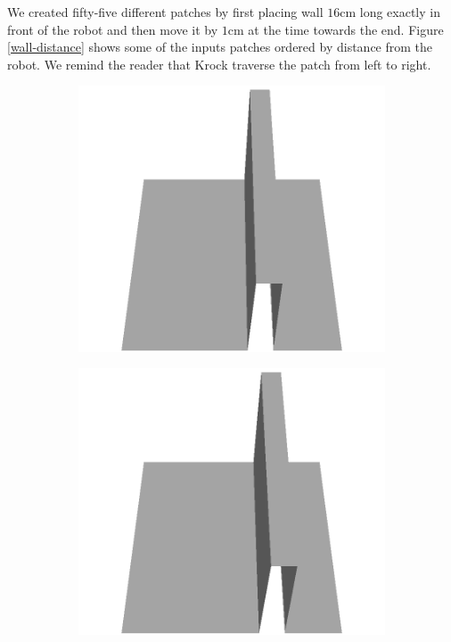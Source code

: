 \documentclass[../document.tex]{subfiles}
\begin{document}
We created fifty-five different patches by first placing wall $16$cm long exactly in front of the robot and then move it by $1$cm at the time towards the end. Figure \ref{wall-distance} shows some of the inputs patches ordered by distance from the robot. We remind the reader that Krock traverse the patch from left to right.
\begin{figure} [htbp]
    \centering
    \begin{subfigure}[b]{0.24\textwidth}
    \includegraphics[width=\linewidth]{../img/5/custom_patches/walls_front/all/00-3d.png}
    \end{subfigure}
    \begin{subfigure}[b]{0.24\textwidth}
    \includegraphics[width=\linewidth]{../img/5/custom_patches/walls_front/all/04-3d.png}

\end{subfigure}
\end{figure}
\end{document}
